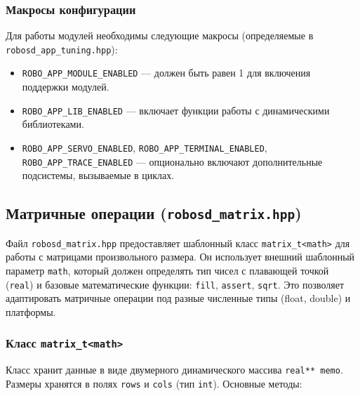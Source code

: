 \documentclass[a4paper,12pt]{article}
\begin{document}
\subsubsection{Макросы конфигурации}

Для работы модулей необходимы следующие макросы (определяемые в \texttt{robosd\_app\_tuning.hpp}):

\begin{itemize}
    \item \texttt{ROBO\_APP\_MODULE\_ENABLED} — должен быть равен 1 для включения поддержки модулей.
    \item \texttt{ROBO\_APP\_LIB\_ENABLED} — включает функции работы с динамическими библиотеками.
    \item \texttt{ROBO\_APP\_SERVO\_ENABLED}, \texttt{ROBO\_APP\_TERMINAL\_ENABLED}, \texttt{ROBO\_APP\_TRACE\_ENABLED} — опционально включают дополнительные подсистемы, вызываемые в циклах.
\end{itemize}

\subsection{Матричные операции (\texttt{robosd\_matrix.hpp})}

Файл \texttt{robosd\_matrix.hpp} предоставляет шаблонный класс \texttt{matrix\_t<math>} для работы с матрицами произвольного размера. Он использует внешний шаблонный параметр \texttt{math}, который должен определять тип чисел с плавающей точкой (\texttt{real}) и базовые математические функции: \texttt{fill}, \texttt{assert}, \texttt{sqrt}. Это позволяет адаптировать матричные операции под разные численные типы (float, double) и платформы.

\subsubsection{Класс \texttt{matrix\_t<math>}}

Класс хранит данные в виде двумерного динамического массива \texttt{real** memo}. Размеры хранятся в полях \texttt{rows} и \texttt{cols} (тип \texttt{int}). Основные методы:
\end{document}
